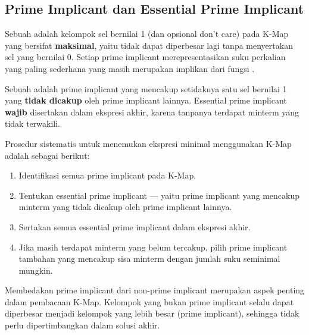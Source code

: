 \subsection{Prime Implicant dan Essential Prime Implicant}

\begin{definisi}
Sebuah  adalah kelompok sel bernilai 1 (dan opsional don't care) pada K-Map yang bersifat \textbf{maksimal}, yaitu tidak dapat diperbesar lagi tanpa menyertakan sel yang bernilai 0. Setiap prime implicant merepresentasikan suku perkalian yang paling sederhana yang masih merupakan implikan dari fungsi \cite{rosen2019}.
\end{definisi}

\begin{definisi}
Sebuah  adalah prime implicant yang mencakup setidaknya satu sel bernilai 1 yang \textbf{tidak dicakup} oleh prime implicant lainnya. Essential prime implicant \textbf{wajib} disertakan dalam ekspresi akhir, karena tanpanya terdapat minterm yang tidak terwakili.
\end{definisi}

Prosedur sistematis untuk menemukan ekspresi minimal menggunakan K-Map adalah sebagai berikut:

\begin{enumerate}
  \item Identifikasi semua prime implicant pada K-Map.
  \item Tentukan essential prime implicant --- yaitu prime implicant yang mencakup minterm yang tidak dicakup oleh prime implicant lainnya.
  \item Sertakan semua essential prime implicant dalam ekspresi akhir.
  \item Jika masih terdapat minterm yang belum tercakup, pilih prime implicant tambahan yang mencakup sisa minterm dengan jumlah suku seminimal mungkin.
\end{enumerate}

\begin{catatan}
Membedakan prime implicant dari non-prime implicant merupakan aspek penting dalam pembacaan K-Map. Kelompok yang bukan prime implicant selalu dapat diperbesar menjadi kelompok yang lebih besar (prime implicant), sehingga tidak perlu dipertimbangkan dalam solusi akhir.
\end{catatan}
